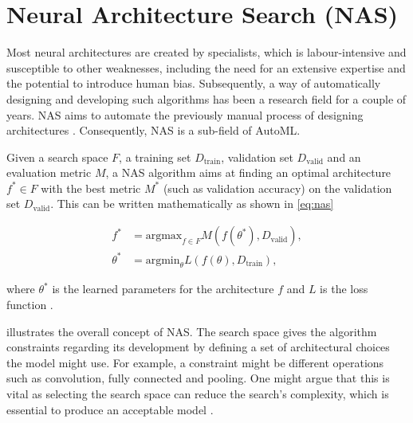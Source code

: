 \section{Neural Architecture Search (NAS)} \label{section:nas}
Most neural architectures are created by specialists, which is labour-intensive and susceptible to other weaknesses, including the need for an extensive expertise and the potential to introduce human bias. Subsequently, a way of automatically designing and developing such algorithms has been a research field for a couple of years. \gls{NAS} aims to automate the previously manual process of designing architectures \autocite{elsken2019neural}. Consequently, \gls{NAS} is a sub-field of \gls{AutoML}. 

Given a search space $F$, a training set $D_{\text{train}}$, validation set $D_{\text{valid}}$ and an evaluation metric $M$, a \gls{NAS} algorithm aims at finding an optimal architecture $f^* \in F$ with the best metric $M^*$ (such as validation accuracy) on the validation set $D_{\text{valid}}$. This can be written mathematically as shown in \cref{eq:nas}

\begin{equation}\label{eq:nas}
\begin{aligned}
    f^* &= \text{argmax}_{f \in F} M(f(\theta^*), D_{\text{valid}}), \\
    \theta^* &= \text{argmin}_{\theta} L(f(\theta), D_{\text{train}}),
\end{aligned}
\end{equation}

where $\theta^*$ is the learned parameters for the architecture $f$ and $L$ is the loss function \autocite{zhou2019auto}. 

 illustrates the overall concept of \gls{NAS}. The search space gives the algorithm constraints regarding its development by defining a set of architectural choices the model might use. For example, a constraint might be different operations such as convolution, fully connected and pooling. One might argue that this is vital as selecting the search space can reduce the search's complexity, which is essential to produce an acceptable model \autocite{kyriakides2020introduction}.


